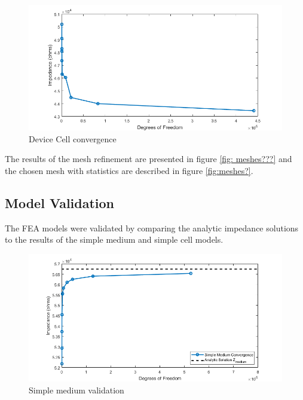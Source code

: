 \begin{figure}
    \centering
    \includegraphics[width=\textwidth]{images/device_cell_convergence.png}
    \caption{Device Cell convergence}
    \label{fig:device_cell_convergence}
\end{figure}

\par The results of the mesh refinement are presented in figure \ref{fig: meshes???} and the chosen mesh with statistics are described in figure \ref{fig:meshes?}.


\subsection{Model Validation}
\par The FEA models were validated by comparing the analytic impedance solutions to the results of the simple medium and simple cell models. 

\begin{figure}
    \centering
    \includegraphics[width=\textwidth]{images/simpeMediumValidation.png}
    \caption{Simple medium validation}
    \label{fig:simple_medium_validation}
\end{figure}


